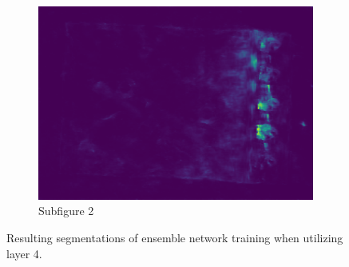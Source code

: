 \begin{figure}[H]
\begin{subfigure}[b]{0.48\textwidth}
\begin{minipage}{0.32\textwidth}
            \includegraphics[width=\textwidth]{figures/DRAEMweakness/logical042segment.png}
        \end{minipage}
        \caption{Subfigure 2}
    \end{subfigure}
    \caption{Resulting segmentations of ensemble network training when utilizing layer 4.}
    \label{fig:DRAEMweakness}
\end{figure}